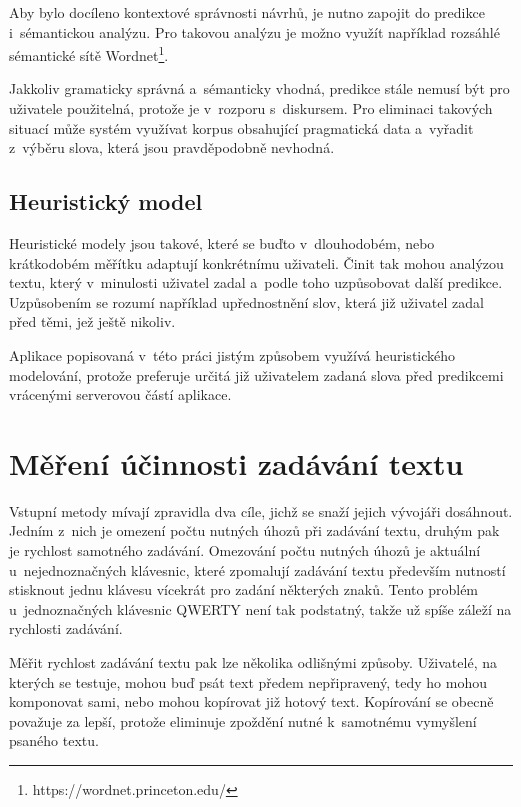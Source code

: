 \documentclass[a4paper,11pt,openany]{book} %
\begin{document}
Aby bylo docíleno kontextové správnosti návrhů, je nutno zapojit do predikce i~sémantickou analýzu. Pro takovou analýzu je možno využít například rozsáhlé sémantické sítě Wordnet\footnote{https://wordnet.princeton.edu/}. \parencite[5235]{ghayoomi2009overview}

Jakkoliv gramaticky správná a~sémanticky vhodná, predikce stále nemusí být pro uživatele použitelná, protože je v~rozporu s~diskursem. Pro eliminaci takových situací může systém využívat korpus obsahující pragmatická data a~vyřadit z~výběru slova, která jsou pravděpodobně nevhodná. \parencite[5235]{ghayoomi2009overview}

\section{Heuristický model}

Heuristické modely jsou takové, které se buďto v~dlouhodobém, nebo krátkodobém měřítku adaptují konkrétnímu uživateli. Činit tak mohou analýzou textu, který v~minulosti uživatel zadal a~podle toho uzpůsobovat další predikce. Uzpůsobením se rozumí například upřednostnění slov, která již uživatel zadal před těmi, jež ještě nikoliv. \parencite[5235]{ghayoomi2009overview}

Aplikace popisovaná v~této práci jistým způsobem využívá heuristického modelování, protože preferuje určitá již uživatelem zadaná slova před predikcemi vrácenými serverovou částí aplikace.

\chapter{Měření účinnosti zadávání textu}

Vstupní metody mívají zpravidla dva cíle, jichž se snaží jejich vývojáři dosáhnout. Jedním z~nich je omezení počtu nutných úhozů při zadávání textu, druhým pak je rychlost samotného zadávání. Omezování počtu nutných úhozů je aktuální u~nejednoznačných klávesnic, které zpomalují zadávání textu především nutností stisknout jednu klávesu vícekrát pro zadání některých znaků. Tento problém u~jednoznačných klávesnic QWERTY není tak podstatný, takže už spíše záleží na rychlosti zadávání.

Měřit rychlost zadávání textu pak lze několika odlišnými způsoby. Uživatelé, na kterých se testuje, mohou buď psát text předem nepřipravený, tedy ho mohou komponovat sami, nebo mohou kopírovat již hotový text. Kopírování se obecně považuje za lepší, protože eliminuje zpoždění nutné k~samotnému vymyšlení psaného textu. \parencite[2]{tarvainen2010beginner} %
\end{document}
